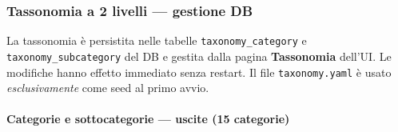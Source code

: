 \documentclass[11pt, a4paper]{article}
\begin{document}
\subsubsection{Tassonomia a 2 livelli --- gestione DB}

\begin{newbox}
La tassonomia è persistita nelle tabelle \texttt{taxonomy\_category} e
\texttt{taxonomy\_subcategory} del DB e gestita dalla pagina \textbf{Tassonomia}
dell'UI. Le modifiche hanno effetto immediato senza restart.
Il file \texttt{taxonomy.yaml} è usato \emph{esclusivamente} come seed al primo avvio.
\end{newbox}

\paragraph{Categorie e sottocategorie --- uscite (15 categorie)}
\end{document}
